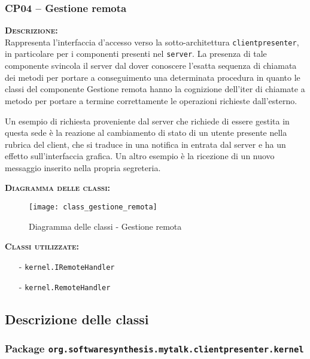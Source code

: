 \subsubsection{CP04 -- Gestione remota}
\begin{description}
	\item{\scshape\bfseries Descrizione:}\\
Rappresenta l'interfaccia d'accesso verso la sotto-architettura \texttt{clientpresenter}, in particolare per i componenti presenti nel \texttt{server}. La presenza di tale componente svincola il server dal dover conoscere l'esatta sequenza di chiamata dei metodi per portare a conseguimento una determinata procedura in quanto le classi del componente \textsf{Gestione remota} hanno la cognizione dell'iter di chiamate a metodo per portare a termine correttamente le operazioni richieste dall'esterno.

Un esempio di richiesta proveniente dal server che richiede di essere gestita in questa sede è la reazione al cambiamento di stato di un utente presente nella rubrica del client, che si traduce in una notifica in entrata dal server e ha un effetto sull'interfaccia grafica. Un altro esempio è la ricezione di un nuovo messaggio inserito nella propria segreteria.

\item{\scshape\bfseries Diagramma delle classi:}
\begin{figure}[H]
  \centering
  \texttt{[image: class\_gestione\_remota]}
  \caption{Diagramma delle classi - Gestione remota}\label{fig:gestioneremota}
\end{figure}

	\item{\scshape\bfseries Classi utilizzate:} 
	\begin{itemize}[noitemsep,nolistsep]
		\item[-] \texttt{kernel.IRemoteHandler}
		\item[-] \texttt{kernel.RemoteHandler}
	\end{itemize}
\end{description}

\subsection{Descrizione delle classi}

\subsubsection{Package \texttt{org.softwaresynthesis.mytalk.clientpresenter.kernel}}


